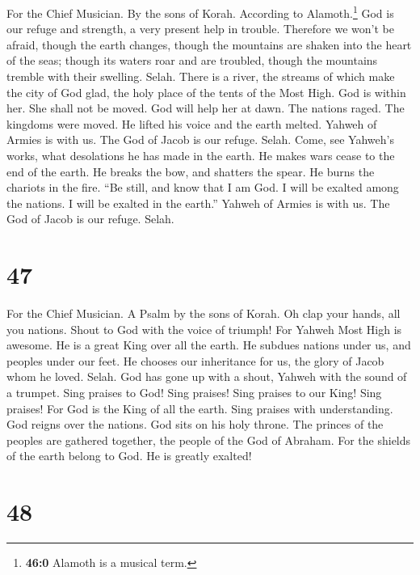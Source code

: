 For the Chief Musician. By the sons of Korah. According to
Alamoth.\footnote{\textbf{46:0} Alamoth is a musical term.}
 God is our refuge and strength, a very present help in
trouble.  Therefore we won't be afraid, though the earth
changes, though the mountains are shaken into the heart of the seas;
 though its waters roar and are troubled, though the
mountains tremble with their swelling. Selah.  There is a
river, the streams of which make the city of God glad, the holy place of
the tents of the Most High.  God is within her. She shall
not be moved. God will help her at dawn.  The nations
raged. The kingdoms were moved. He lifted his voice and the earth
melted.  Yahweh of Armies is with us. The God of Jacob is
our refuge. Selah.  Come, see Yahweh's works, what
desolations he has made in the earth.  He makes wars cease
to the end of the earth. He breaks the bow, and shatters the spear. He
burns the chariots in the fire.  ``Be still, and know
that I am God. I will be exalted among the nations. I will be exalted in
the earth.''  Yahweh of Armies is with us. The God of
Jacob is our refuge. Selah.

\hypertarget{section-46}{%
\section{47}\label{section-46}}

For the Chief Musician. A Psalm by the sons of Korah.  Oh
clap your hands, all you nations. Shout to God with the voice of
triumph!  For Yahweh Most High is awesome. He is a great
King over all the earth.  He subdues nations under us, and
peoples under our feet.  He chooses our inheritance for
us, the glory of Jacob whom he loved. Selah.  God has gone
up with a shout, Yahweh with the sound of a trumpet.  Sing
praises to God! Sing praises! Sing praises to our King! Sing praises!
 For God is the King of all the earth. Sing praises with
understanding.  God reigns over the nations. God sits on
his holy throne.  The princes of the peoples are gathered
together, the people of the God of Abraham. For the shields of the earth
belong to God. He is greatly exalted!

\hypertarget{section-47}{%
\section{48}\label{section-47}}

